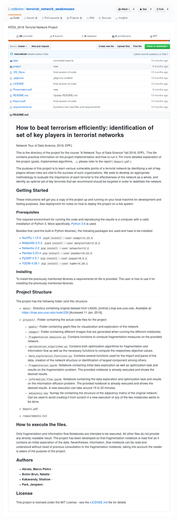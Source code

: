 \documentclass[aspectratio=169]{beamer}
\begin{document}
\begin{frame}
\begin{minipage}{0.48\linewidth}
	\includegraphics[width=\linewidth,trim={0 18cm 0 0},clip]{project_27_github}
	\end{minipage}
\end{frame}
\end{document}
